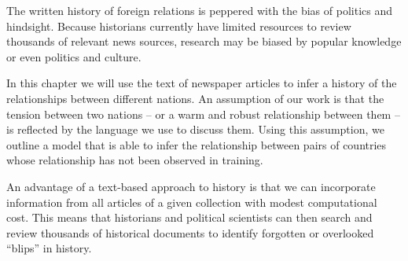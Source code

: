 The written history of foreign relations is peppered with the bias of
politics and hindsight.  Because historians currently have limited
resources to review thousands of relevant news sources, research may
be biased by popular knowledge or even politics and culture. 

In this chapter we will use the text of newspaper articles to infer a
history of the relationships between different nations. An assumption
of our work is that the tension between two nations -- or a warm and
robust relationship between them -- is reflected by the language we
use to discuss them. Using this assumption, we outline a model that is
able to infer the relationship between pairs of countries whose
relationship has not been observed in training.


An advantage of a text-based approach to history is that we can
incorporate information from all articles of a given collection with
modest computational cost.  This means that historians and political
scientists can then search and review thousands of historical
documents to identify forgotten or overlooked ``blips'' in history.


